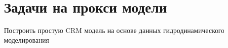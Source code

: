 \section{Задачи на прокси модели}

Построить простую CRM модель на основе данных гидродинамического моделирования

